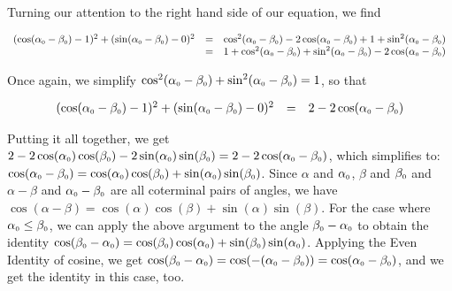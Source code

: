 Turning our attention to the right hand side of our equation, we find

\[ \begin{array}{rcl}
(\cos(\alpha_{\mbox{\tiny $0$}} - \beta_{\mbox{\tiny $0$}}) - 1)^2 + (\sin(\alpha_{\mbox{\tiny $0$}} - \beta_{\mbox{\tiny $0$}}) - 0)^2 & = & \cos^2(\alpha_{\mbox{\tiny $0$}} - \beta_{\mbox{\tiny $0$}}) - 2\cos(\alpha_{\mbox{\tiny $0$}} - \beta_{\mbox{\tiny $0$}}) + 1 + \sin^2(\alpha_{\mbox{\tiny $0$}} - \beta_{\mbox{\tiny $0$}}) \\ 
& = & 1 +  \cos^2(\alpha_{\mbox{\tiny $0$}} - \beta_{\mbox{\tiny $0$}}) + \sin^2(\alpha_{\mbox{\tiny $0$}} - \beta_{\mbox{\tiny $0$}}) - 2\cos(\alpha_{\mbox{\tiny $0$}} - \beta_{\mbox{\tiny $0$}}) \\
\end{array} \]

Once again, we simplify $\cos^2(\alpha_{\mbox{\tiny $0$}} - \beta_{\mbox{\tiny $0$}}) + \sin^2(\alpha_{\mbox{\tiny $0$}} - \beta_{\mbox{\tiny $0$}})= 1$, so that

\[ \begin{array}{rcl}
(\cos(\alpha_{\mbox{\tiny $0$}} - \beta_{\mbox{\tiny $0$}}) - 1)^2 + (\sin(\alpha_{\mbox{\tiny $0$}} - \beta_{\mbox{\tiny $0$}}) - 0)^2 & = & 2  - 2\cos(\alpha_{\mbox{\tiny $0$}} - \beta_{\mbox{\tiny $0$}}) \\ \end{array} \]

Putting it all together, we get $2  - 2\cos(\alpha_{\mbox{\tiny $0$}})\cos(\beta_{\mbox{\tiny $0$}}) - 2\sin(\alpha_{\mbox{\tiny $0$}})\sin(\beta_{\mbox{\tiny $0$}}) = 2  - 2\cos(\alpha_{\mbox{\tiny $0$}} - \beta_{\mbox{\tiny $0$}})$, which simplifies to: $\cos(\alpha_{\mbox{\tiny $0$}} - \beta_{\mbox{\tiny $0$}}) = \cos(\alpha_{\mbox{\tiny $0$}})\cos(\beta_{\mbox{\tiny $0$}}) + \sin(\alpha_{\mbox{\tiny $0$}})\sin(\beta_{\mbox{\tiny $0$}})$.  Since $\alpha$ and $\alpha_{\mbox{\tiny $0$}}$, $\beta$ and $\beta_{\mbox{\tiny $0$}}$ and $\alpha - \beta$ and $\alpha_{\mbox{\tiny $0$}}- \beta_{\mbox{\tiny $0$}}$ are all coterminal pairs of angles, we have $\cos(\alpha - \beta) = \cos(\alpha) \cos(\beta) + \sin(\alpha) \sin(\beta)$.  For the case where $\alpha_{\mbox{\tiny $0$}} \leq \beta_{\mbox{\tiny $0$}}$, we can apply the above argument to the angle $\beta_{\mbox{\tiny $0$}} - \alpha_{\mbox{\tiny $0$}}$ to obtain the identity  $\cos(\beta_{\mbox{\tiny $0$}} - \alpha_{\mbox{\tiny $0$}}) = \cos(\beta_{\mbox{\tiny $0$}})\cos(\alpha_{\mbox{\tiny $0$}}) + \sin(\beta_{\mbox{\tiny $0$}})\sin(\alpha_{\mbox{\tiny $0$}})$.  Applying the Even Identity of cosine, we get $\cos(\beta_{\mbox{\tiny $0$}} - \alpha_{\mbox{\tiny $0$}}) = \cos( - (\alpha_{\mbox{\tiny $0$}} - \beta_{\mbox{\tiny $0$}})) = \cos(\alpha_{\mbox{\tiny $0$}} - \beta_{\mbox{\tiny $0$}})$, and we get the identity in this case, too.   

